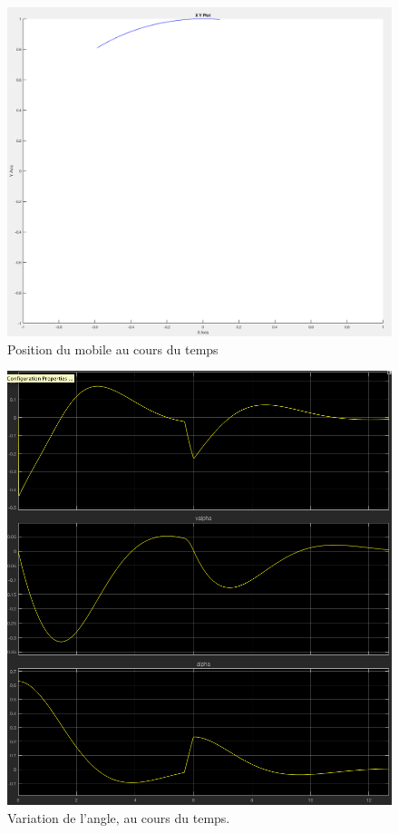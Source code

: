 \documentclass[11pt]{article}
\begin{document}
\begin{figure}[H]
	\includegraphics[scale=0.2]{images/pendule_inverse_xy}
	\caption{Position du mobile au cours du temps}
\end{figure}
\begin{figure}[H]
	\includegraphics[scale=0.25]{images/pendule_inverse_graph}
	\caption{Variation de l'angle, au cours du temps.}
\end{figure}
\end{document}
